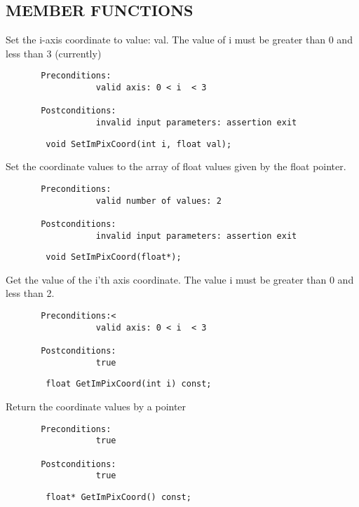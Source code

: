 \subsection*{MEMBER FUNCTIONS}
      
           Set the i-axis coordinate to value: val. The value of i must
           be greater than 0 and less than 3 (currently)
\small\begin{verbatim}
       Preconditions:
                  valid axis: 0 < i  < 3
          
       Postconditions:
                  invalid input parameters: assertion exit
\end{verbatim}\normalsize
\begin{verbatim}
        void SetImPixCoord(int i, float val);
\end{verbatim}

           Set the coordinate values to the array of float values given by
           the float pointer.
\small\begin{verbatim}
       Preconditions:
                  valid number of values: 2
          
       Postconditions:
                  invalid input parameters: assertion exit
\end{verbatim}\normalsize
\begin{verbatim}
        void SetImPixCoord(float*);
\end{verbatim}

           Get the value of the i'th axis coordinate. The value i must be
           greater than 0 and less than 2.
\small\begin{verbatim}
       Preconditions:<
                  valid axis: 0 < i  < 3
          
       Postconditions:
                  true
\end{verbatim}\normalsize
\begin{verbatim}
        float GetImPixCoord(int i) const;
\end{verbatim}

           Return the coordinate values by a pointer
\small\begin{verbatim}
       Preconditions:
                  true
          
       Postconditions:
                  true
\end{verbatim}\normalsize
\begin{verbatim}
        float* GetImPixCoord() const;
\end{verbatim}


